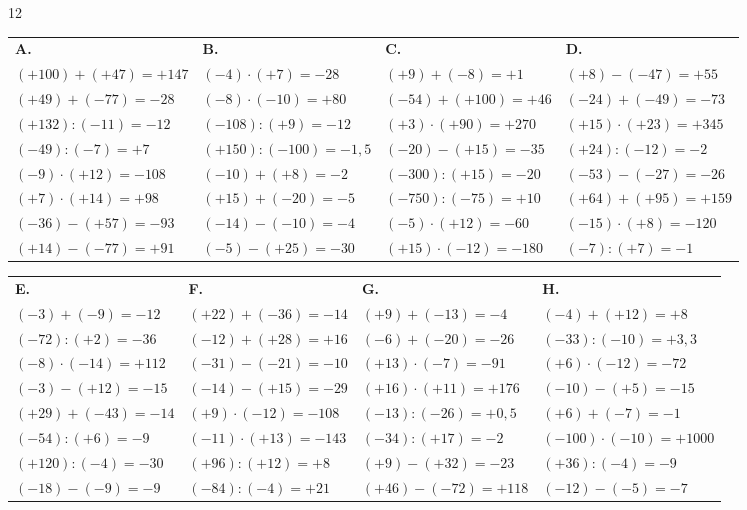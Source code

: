 \begin{solution}{12}

\def\arraystretch{1.7}
\begin{tabularx}{\linewidth}{*{4}{X}}
\textbf{A.} & \textbf{B.} & \textbf{C.} & \textbf{D.} \\
$(+100)+(+47)=+147$ & $(-4)\cdot(+7)=-28$    & $(+9)+(-8)=+1$       & $(+8)-(-47)=+55$      \\
$(+49)+(-77)=-28$   & $(-8)\cdot(-10)=+80$   & $(-54)+(+100)=+46$   & $(-24)+(-49)=-73$     \\
$(+132):(-11)=-12$  & $(-108):(+9)=-12$      & $(+3)\cdot(+90)=+270$& $(+15)\cdot(+23)=+345$\\
$(-49):(-7)=+7$     & $(+150):(-100)=-1{,}5$ & $(-20)-(+15)=-35$    & $(+24):(-12)=-2$      \\
$(-9)\cdot(+12)=-108$ & $(-10)+(+8)=-2$      & $(-300):(+15)=-20$   & $(-53)-(-27)=-26$     \\
$(+7)\cdot(+14)=+98$& $(+15)+(-20)=-5$       & $(-750):(-75)=+10$   & $(+64)+(+95)=+159$    \\
$(-36)-(+57)=-93$   & $(-14)-(-10)=-4$       & $(-5)\cdot(+12)=-60$ & $(-15)\cdot(+8)=-120$ \\
$(+14)-(-77)=+91$   & $(-5)-(+25)=-30$       & $(+15)\cdot(-12)=-180$& $(-7):(+7)=-1$       \\
\end{tabularx}

\bigskip
\begin{tabularx}{\linewidth}{*{4}{X}}
\textbf{E.} & \textbf{F.} & \textbf{G.} & \textbf{H.} \\
$(-3)+(-9)=-12$      & $(+22)+(-36)=-14$     & $(+9)+(-13)=-4$      & $(-4)+(+12)=+8$       \\
$(-72):(+2)=-36$     & $(-12)+(+28)=+16$     & $(-6)+(-20)=-26$     & $(-33):(-10)=+3{,}3$  \\
$(-8)\cdot(-14)=+112$& $(-31)-(-21)=-10$     & $(+13)\cdot(-7)=-91$ & $(+6)\cdot(-12)=-72$  \\
$(-3)-(+12)=-15$     & $(-14)-(+15)=-29$     & $(+16)\cdot(+11)=+176$& $(-10)-(+5)=-15$     \\
$(+29)+(-43)=-14$    & $(+9)\cdot(-12)=-108$ & $(-13):(-26)=+0{,}5$ & $(+6)+(-7)=-1$        \\
$(-54):(+6)=-9$      & $(-11)\cdot(+13)=-143$& $(-34):(+17)=-2$     & $(-100)\cdot(-10)=+1000$ \\
$(+120):(-4)=-30$    & $(+96):(+12)=+8$      & $(+9)-(+32)=-23$     & $(+36):(-4)=-9$       \\
$(-18)-(-9)=-9$      & $(-84):(-4)=+21$      & $(+46)-(-72)=+118$   & $(-12)-(-5)=-7$       \\
\end{tabularx}


\end{solution}

